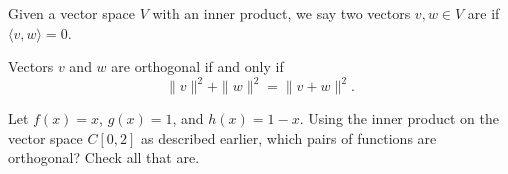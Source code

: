 \edXsolution{
\[ \|f\| = \sqrt{\langle f, f\rangle} = \sqrt{\int_0^2 f(x)^2 \ dx} = \sqrt{\int_0^2 1 \ dx} = \sqrt{2}.\]
}

\endedxproblem



\endedxvertical




{} Given a vector space $V$ with an inner product, we say two vectors $v,w\in V$ are {} if $\langle v,w\rangle = 0$.  

{} Vectors $v$ and $w$ are orthogonal if and only if 
\[\|v\|^2 + \|w\|^2 = \|v+w\|^2.\]

\endedxtext



Let $f(x) = x$, $g(x) = 1$, and $h(x) = 1-x$.  
Using the inner product on the vector space $C[0,2]$ as described earlier, 
which pairs of functions are orthogonal?  Check all that are.    



\endedxproblem

\endedxvertical







